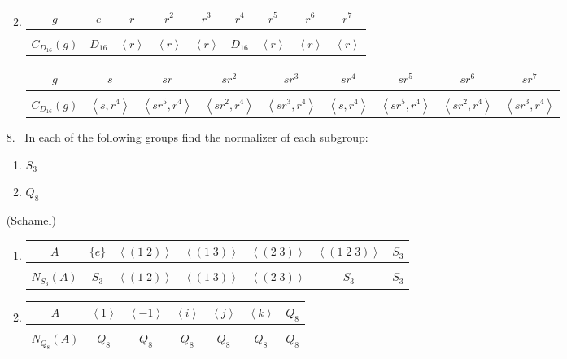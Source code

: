 \documentclass[10pt]{article}
\theoremstyle{plain}
\newcommand{\gen}[1]{\left\langle #1 \right\rangle}
\begin{document}
\begin{itemize}
\begin{enumerate}
\begin{center}
\begin{tabular}{c|cccccc}
\end{tabular}
\end{center}
\item \noindent
\begin{center}
\begin{tabular}{c|cccccccc}
$g $&  $e$ & $r$&$r^2$&$r^3$&$r^4$&$r^5$&$r^6$&$r^7$ \\
\hline \\
$C_{D_{16}}(g)$ & $D_{16}$ & $\gen{r}$&$\gen{r}$&$\gen{r}$&$D_{16}$&$\gen{r}$&$\gen{r}$&$\gen{r}$\\
\end{tabular}
\vskip0.3in
\begin{tabular}{c|cccccccc}
$g $&  $s$ & $sr$&$sr^2$&$sr^3$&$sr^4$&$sr^5$&$sr^6$&$sr^7$ \\
\hline \\
$C_{D_{16}}(g)$ & $\gen{s,r^4}$ & $\gen{sr^5,r^4}$&$\gen{sr^2,r^4}$&$\gen{sr^3,r^4}$&$\gen{s,r^4}$&$\gen{sr^5,r^4}$&$\gen{sr^2,r^4}$&$\gen{sr^3,r^4}$\\
\end{tabular}
\end{center}
\end{enumerate}

\item[8.] \ In each of the following groups find the normalizer of each subgroup:
\begin{enumerate}
\item $S_3$
\item $Q_8$
\end{enumerate}
(Schamel)
\begin{enumerate}
\item \noindent
\begin{center}
\begin{tabular}{c|cccccc}
$A $&  $\{e\}$ & $\gen{(1\;2)}$&$\gen{(1\;3)}$&$\gen{(2\;3)}$&$\gen{(1\;2\;3)}$&$S_3$ \\
\hline \\
$N_{S_3}(A)$ & $S_3$ & $\gen{(1\;2)}$&$\gen{(1\;3)}$&$\gen{(2\;3)}$&$S_3$&$S_3$\\
\end{tabular}
\end{center}
\item \noindent
\begin{center}
\begin{tabular}{c|cccccc}
$A $&  $\gen{1}$ & $\gen{-1}$&$\gen{i}$&$\gen{j}$&$\gen{k}$&$Q_8$ \\
\hline \\
$N_{Q_8}(A)$ & $Q_8$ & $Q_8$&$Q_8$&$Q_8$&$Q_8$&$Q_8$\\
\end{tabular}
\end{center}
\end{enumerate}


\end{itemize}
\end{document}
